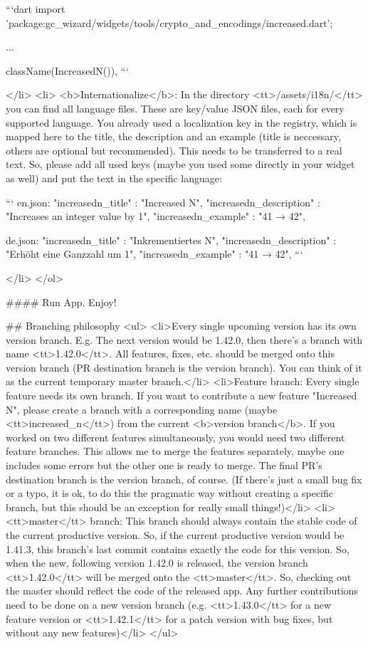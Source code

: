 ```dart
import 'package:gc_wizard/widgets/tools/crypto_and_encodings/increased.dart';

...

className(IncreasedN()),
```

</li>
	<li>
		<b>Internationalize</b>: In the directory <tt>/assets/i18n/</tt> you can find all language files. These are key/value JSON files, each for every supported language. You already used a localization key in the registry, which is mapped here to the title, the description and an example (title is neccessary, others are optional but recommended). This needs to be transferred to a real text. So, please add all used keys (maybe you used some directly in your widget as well) and put the text in the specific language:

```
en.json:
 "increasedn_title" : "Increased N",
 "increasedn_description" : "Increases an integer value by 1",
 "increasedn_example" : "41 → 42",

de.json:
 "increasedn_title" : "Inkrementiertes N",
 "increasedn_description" : "Erhöht eine Ganzzahl um 1",
 "increasedn_example" : "41 → 42",
```
    
</li>
</ol>

#### Run App. Enjoy!

## Branching philosophy
<ul>
	<li>Every single upcoming version has its own version branch. E.g. The next version would be 1.42.0, then there's a branch with name <tt>1.42.0</tt>. All features, fixes, etc. should be merged onto this version branch (PR destination branch is the version branch). You can think of it as the current temporary master branch.</li>
	<li>Feature branch: Every single feature needs its own branch. If you want to contribute a new feature "Increased N", please create a branch with a corresponding name (maybe <tt>increased_n</tt>) from the current <b>version branch</b>. If you worked on two different features simultaneously, you would need two different feature branches. This allows me to merge the features separately, maybe one includes some errors but the other one is ready to merge. The final PR's destination branch is the version branch, of course. (If there's just a small bug fix or a typo, it is ok, to do this the pragmatic way without creating a specific branch, but this should be an exception for really small things!)</li>
	<li><tt>master</tt> branch: This branch should always contain the stable code of the current productive version. So, if the current productive version would be 1.41.3, this branch's last commit contains exactly the code for this version. So, when the new, following version 1.42.0 is released, the version branch <tt>1.42.0</tt> will be merged onto the <tt>master</tt>. So, checking out the master should reflect the code of the released app. Any further contributions need to be done on a new version branch (e.g. <tt>1.43.0</tt> for a new feature version or <tt>1.42.1</tt> for a patch version with bug fixes, but without any new features)</li>
</ul>

